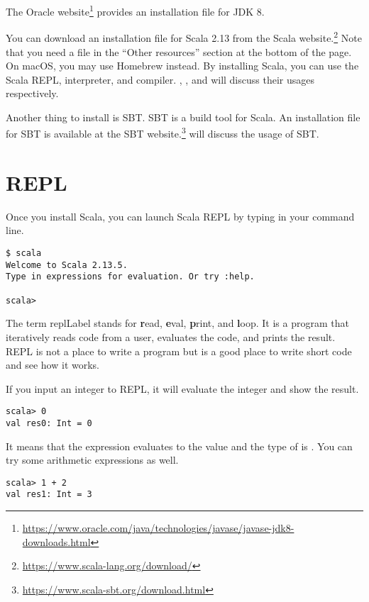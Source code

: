 The Oracle website\footnote{\url{https://www.oracle.com/java/technologies/javase/javase-jdk8-downloads.html}}
provides an installation file for JDK 8.

You can download an installation file for Scala 2.13 from the Scala
website.\footnote{\url{https://www.scala-lang.org/download/}} Note that you need a
file in the ``Other resources'' section at the bottom of the page.
On macOS, you may use Homebrew instead. By installing Scala, you can use the
Scala REPL, interpreter, and compiler. ,
, and  will discuss
their usages respectively.

Another thing to install is SBT. SBT is a build tool for Scala. An installation
file for SBT is available at the SBT
website.\footnote{\url{https://www.scala-sbt.org/download.html}}
 will discuss the usage of SBT.

\section{REPL}

Once you install Scala, you can launch Scala REPL by typing  in
your command line.

\begin{verbatim}
$ scala
Welcome to Scala 2.13.5.
Type in expressions for evaluation. Or try :help.

scala>
\end{verbatim}

The term \acrshort{replLabel} stands for \textbf{r}ead, \textbf{e}val, \textbf{p}rint, and
\textbf{l}oop.
It is a program that iteratively reads code from a user, evaluates the code,
and prints the result. REPL is not a place to write a program but is a good
place to write short code and see how it works.

If you input an integer to REPL, it will evaluate the integer and show the
result.

\begin{verbatim}
scala> 0
val res0: Int = 0
\end{verbatim}

It means that the expression  evaluates to the value  and the type of
 is .
You can try some arithmetic expressions as well.

\begin{verbatim}
scala> 1 + 2
val res1: Int = 3
\end{verbatim}

